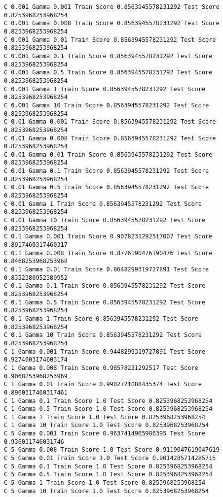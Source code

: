 \documentclass[11pt]{article}
\begin{document}
    \begin{Verbatim}[commandchars=\\\{\}]
C 0.001 Gamma 0.001 Train Score 0.8563945578231292 Test Score 0.8253968253968254
C 0.001 Gamma 0.008 Train Score 0.8563945578231292 Test Score 0.8253968253968254
C 0.001 Gamma 0.01 Train Score 0.8563945578231292 Test Score 0.8253968253968254
C 0.001 Gamma 0.1 Train Score 0.8563945578231292 Test Score 0.8253968253968254
C 0.001 Gamma 0.5 Train Score 0.8563945578231292 Test Score 0.8253968253968254
C 0.001 Gamma 1 Train Score 0.8563945578231292 Test Score 0.8253968253968254
C 0.001 Gamma 10 Train Score 0.8563945578231292 Test Score 0.8253968253968254
C 0.01 Gamma 0.001 Train Score 0.8563945578231292 Test Score 0.8253968253968254
C 0.01 Gamma 0.008 Train Score 0.8563945578231292 Test Score 0.8253968253968254
C 0.01 Gamma 0.01 Train Score 0.8563945578231292 Test Score 0.8253968253968254
C 0.01 Gamma 0.1 Train Score 0.8563945578231292 Test Score 0.8253968253968254
C 0.01 Gamma 0.5 Train Score 0.8563945578231292 Test Score 0.8253968253968254
C 0.01 Gamma 1 Train Score 0.8563945578231292 Test Score 0.8253968253968254
C 0.01 Gamma 10 Train Score 0.8563945578231292 Test Score 0.8253968253968254
C 0.1 Gamma 0.001 Train Score 0.9078231292517007 Test Score 0.8917460317460317
C 0.1 Gamma 0.008 Train Score 0.8776190476190476 Test Score 0.8468253968253968
C 0.1 Gamma 0.01 Train Score 0.8648299319727891 Test Score 0.8352380952380952
C 0.1 Gamma 0.1 Train Score 0.8563945578231292 Test Score 0.8253968253968254
C 0.1 Gamma 0.5 Train Score 0.8563945578231292 Test Score 0.8253968253968254
C 0.1 Gamma 1 Train Score 0.8563945578231292 Test Score 0.8253968253968254
C 0.1 Gamma 10 Train Score 0.8563945578231292 Test Score 0.8253968253968254
C 1 Gamma 0.001 Train Score 0.9448299319727891 Test Score 0.9274603174603174
C 1 Gamma 0.008 Train Score 0.98578231292517 Test Score 0.9068253968253969
C 1 Gamma 0.01 Train Score 0.9902721088435374 Test Score 0.8960317460317461
C 1 Gamma 0.1 Train Score 1.0 Test Score 0.8253968253968254
C 1 Gamma 0.5 Train Score 1.0 Test Score 0.8253968253968254
C 1 Gamma 1 Train Score 1.0 Test Score 0.8253968253968254
C 1 Gamma 10 Train Score 1.0 Test Score 0.8253968253968254
C 5 Gamma 0.001 Train Score 0.9637414965986395 Test Score 0.936031746031746
C 5 Gamma 0.008 Train Score 1.0 Test Score 0.9119047619047619
C 5 Gamma 0.01 Train Score 1.0 Test Score 0.9014285714285715
C 5 Gamma 0.1 Train Score 1.0 Test Score 0.8253968253968254
C 5 Gamma 0.5 Train Score 1.0 Test Score 0.8253968253968254
C 5 Gamma 1 Train Score 1.0 Test Score 0.8253968253968254
C 5 Gamma 10 Train Score 1.0 Test Score 0.8253968253968254

    \end{Verbatim}
\end{document}
